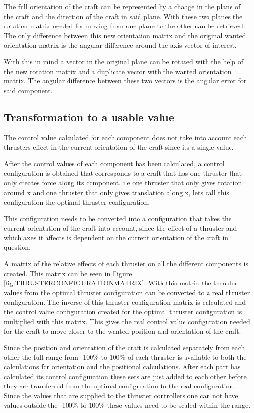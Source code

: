 The full orientation of the craft can be represented by a change in the plane of the craft and the direction of the craft in said plane. With these two planes the rotation matrix needed for moving from one plane to the other can be retrieved. The only difference between this new orientation matrix and the original wanted orientation matrix is the angular difference around the axis vector of interest.

With this in mind a vector in the original plane can be rotated with the help of the new rotation matrix and a duplicate vector with the wanted orientation matrix. The angular difference between these two vectors is the angular error for said component.

\subsection{Transformation to a usable value}
The control value calculated for each component does not take into account each thrusters effect in the current orientation of the craft since its a single value.

After the control values of each component has been calculated, a control configuration is obtained that corresponds to a craft that has one thruster that only creates force along its component. i.e one thruster that only gives rotation around x and one thruster that only gives translation along x, lets call this configuration  the optimal thruster configuration. 

This configuration needs to be converted into a configuration that takes the current orientation of the craft into account, since the effect of a thruster and which axes it affects is dependent on the current orientation of the craft in question. 

A matrix of the relative effects of each thruster on all the different components is created. This matrix can be seen in Figure \ref{fig:THRUSTERCONFIGURATIONMATRIX}. With this matrix the thruster values from the optimal thruster configuration can be converted to a real thruster configuration. The inverse of this thruster configuration matrix is calculated and the control value configuration created for the optimal thruster configuration is multiplied with this matrix. This gives the real control value configuration needed for the craft to move closer to the wanted position and orientation of the craft.

Since the position and orientation of the craft is calculated separately from each other the full range from -100\% to 100\% of each thruster is available to both the calculations for orientation and the positional calculations. After each part has calculated its control configuration these sets are just added to each other before they are transferred from the optimal configuration to the real configuration. Since the values that are supplied to the thruster controllers one can not have values outside the -100\% to 100\% these values need to be scaled within the range. 


